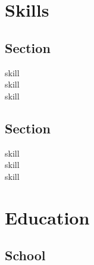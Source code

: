 \documentclass[letterpaper]{resume} %
\begin{document}



\begin{minipage}[t]{0.2\textwidth} %


	\section{Skills}

	\subsection{Section}

	skill \\
	skill \\
	skill \\

	\sectionspace %

	\subsection{Section}

	skill \\
	skill \\
	skill \\

	\sectionspace %


	\section{Education}

	\subsection{School}


	\sectionspace %


\end{minipage} %
\end{document}
